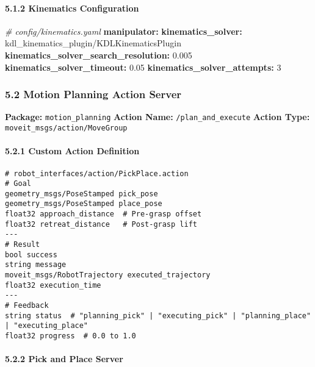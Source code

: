 \documentclass[
]{article}
\newenvironment{Shaded}{\begin{snugshade}}{\end{snugshade}}
\newcommand{\AttributeTok}[1]{\textcolor[rgb]{0.13,0.29,0.53}{#1}}
\newcommand{\CommentTok}[1]{\textcolor[rgb]{0.56,0.35,0.01}{\textit{#1}}}
\newcommand{\DecValTok}[1]{\textcolor[rgb]{0.00,0.00,0.81}{#1}}
\newcommand{\FloatTok}[1]{\textcolor[rgb]{0.00,0.00,0.81}{#1}}
\newcommand{\FunctionTok}[1]{\textcolor[rgb]{0.13,0.29,0.53}{\textbf{#1}}}
\newcommand{\KeywordTok}[1]{\textcolor[rgb]{0.13,0.29,0.53}{\textbf{#1}}}
\begin{document}
\hypertarget{kinematics-configuration}{%
\paragraph{5.1.2 Kinematics
Configuration}\label{kinematics-configuration}}

\begin{Shaded}
\begin{Highlighting}[]
\CommentTok{\# config/kinematics.yaml}
\FunctionTok{manipulator}\KeywordTok{:}
\AttributeTok{  }\FunctionTok{kinematics\_solver}\KeywordTok{:}\AttributeTok{ kdl\_kinematics\_plugin/KDLKinematicsPlugin}
\AttributeTok{  }\FunctionTok{kinematics\_solver\_search\_resolution}\KeywordTok{:}\AttributeTok{ }\FloatTok{0.005}
\AttributeTok{  }\FunctionTok{kinematics\_solver\_timeout}\KeywordTok{:}\AttributeTok{ }\FloatTok{0.05}
\AttributeTok{  }\FunctionTok{kinematics\_solver\_attempts}\KeywordTok{:}\AttributeTok{ }\DecValTok{3}
\end{Highlighting}
\end{Shaded}

\hypertarget{motion-planning-action-server}{%
\subsubsection{5.2 Motion Planning Action
Server}\label{motion-planning-action-server}}

\textbf{Package:} \texttt{motion\_planning} \textbf{Action Name:}
\texttt{/plan\_and\_execute} \textbf{Action Type:}
\texttt{moveit\_msgs/action/MoveGroup}

\hypertarget{custom-action-definition}{%
\paragraph{5.2.1 Custom Action
Definition}\label{custom-action-definition}}

\begin{verbatim}
# robot_interfaces/action/PickPlace.action
# Goal
geometry_msgs/PoseStamped pick_pose
geometry_msgs/PoseStamped place_pose
float32 approach_distance  # Pre-grasp offset
float32 retreat_distance   # Post-grasp lift
---
# Result
bool success
string message
moveit_msgs/RobotTrajectory executed_trajectory
float32 execution_time
---
# Feedback
string status  # "planning_pick" | "executing_pick" | "planning_place" | "executing_place"
float32 progress  # 0.0 to 1.0
\end{verbatim}

\hypertarget{pick-and-place-server}{%
\paragraph{5.2.2 Pick and Place Server}\label{pick-and-place-server}}
\end{document}
